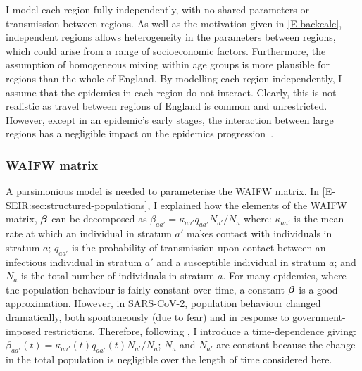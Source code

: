 \documentclass[thesis.tex]{subfiles}
\begin{document}

I model each region fully independently, \ie with no shared parameters or transmission between regions.
As well as the motivation given in \cref{E-backcalc}, independent regions allows heterogeneity in the parameters between regions, which could arise from a range of socioeconomic factors.
Furthermore, the assumption of homogeneous mixing within age groups is more plausible for regions than the whole of England.
By modelling each region independently, I assume that the epidemics in each region do not interact.
Clearly, this is not realistic as travel between regions of England is common and unrestricted.
However, except in an epidemic's early stages, the interaction between large regions has a negligible impact on the epidemics progression~\autocite[e.g.][]{birrellRealtimea,gogSpatial,eggoSpatial}.

\subsubsection{WAIFW matrix} \label{SEIR:sec:WAIFW-application}

A parsimonious model is needed to parameterise the WAIFW matrix.
In \cref{E-SEIR:sec:structured-populations}, I explained how the elements of the WAIFW matrix, $\bm{\beta}$ can be decomposed as $\beta_{aa'} = \kappa_{aa'} q_{aa'} N_{a'} / N_{a}$ where: $\kappa_{aa'}$ is the mean rate at which an individual in stratum $a'$ makes contact with individuals in stratum $a$; $q_{aa'}$ is the probability of transmission upon contact between an infectious individual in stratum $a'$ and a susceptible individual in stratum $a$; and $N_{a}$ is the total number of individuals in stratum $a$.
For many epidemics, where the population behaviour is fairly constant over time, a constant $\bm{\beta}$ is a good approximation.
However, in SARS-CoV-2, population behaviour changed dramatically, both spontaneously (\eg due to fear) and in response to government-imposed restrictions.
Therefore, following \textcite{birrellRealtime}, I introduce a time-dependence giving: $\beta_{aa'}(t) = \kappa_{aa'}(t) q_{aa'}(t) N_{a'} / N_a$; $N_a$ and $N_{a'}$ are constant because the change in the total population is negligible over the length of time considered here.
\end{document}
